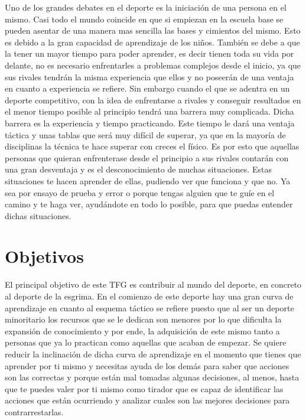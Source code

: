 Uno de los grandes debates en el deporte es la iniciación de una persona
en el mismo. Casi todo el mundo coincide en que si empiezan en la escuela base se pueden
asentar de una manera mas sencilla las bases y cimientos del mismo. Esto es debido
a la gran capacidad de aprendizaje de los niños. También se debe a que la tener
un mayor tiempo para poder aprender, es decir tienen toda su vida por delante,
no es necesario enfrentarles a problemas complejos desde el inicio, ya que
sus rivales tendrán la misma experiencia que ellos y no poseerán de una
ventaja en cuanto a experiencia se refiere. Sin embargo cuando el que se adentra
en un deporte competitivo, con la idea de enfrentarse a rivales y conseguir resultados
en el menor tiempo posible al principio tendrá una barrera muy complicada. Dicha barrera
es la experiencia y tiempo practicando. Este tiempo le dará una ventaja táctica y unas tablas
que será muy difícil de superar, ya que en la mayoría de disciplinas la técnica
te hace superar con creces el físico. Es por esto que aquellas personas que
quieran enfrenterase desde el principio a sus rivales contarán con una gran
desventaja y es el desconocimiento de muchas situaciones. Estas situaciones
te hacen aprender de ellas, pudiendo ver que funciona y que no. Ya sea por
ensayo de prueba y error o porque tengas alguien que te guíe en el camino
y te haga ver, ayudándote en todo lo posible, para que puedas entender
dichas situaciones.

\section{Objetivos}

El principal objetivo de este TFG es contribuir al mundo del deporte, en concreto al
 deporte de la esgrima. En el comienzo de este deporte hay una gran curva de aprendizaje
 en cuanto al esquema táctico se refiere puesto que al ser un deporte minoritario los
 recursos que se le dedican son menores por lo que dificulta la expansión de conocimiento
 y por ende, la adquisición de este mismo tanto a personas que ya lo practican como aquellas
 que acaban de empezar. Se quiere reducir la inclinación de dicha curva de aprendizaje
 en el momento que tienes que aprender por ti mismo y necesitas ayuda de los demás
 para saber que acciones son las correctas y porque están mal tomadas algunas decisiones,
 al menos, hasta que te puedes valer por ti mismo como tirador que es capaz de identificar
 las acciones que están ocurriendo y analizar cuales son las mejores decisiones para contrarrestarlas.

